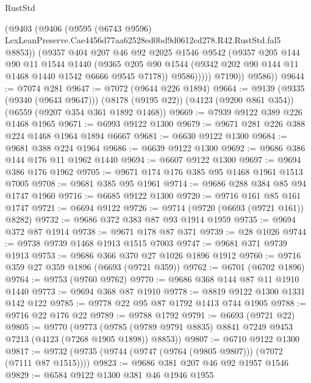\begin{lexlean}{RustStd}
\begin{coremodule}
                (@9403
                  (@9406
                    (@9595
                      (@6743 @9596)
                      LexLeanPreserve.Cae4456d77aa62528ed0bd9d0612cd278.R42.RustStd.fal5
                      @8853))
                  (@9357
                    @404
                    @207
                    @46
                    @92
                    @2025
                    @1546
                    @9542
                    (@9357
                      @205
                      @144
                      @90
                      @11
                      @1544
                      @1440
                      (@9365
                        @205
                        @90
                        @1544
                        (@9342 @202 @90 @144 @11 @1468 @1440 @1542 @6666 @9545 @7178))
                      @9586)))))
            @7190))
        @9586))
@9644 := @7074 @281
@9647 := @7072 (@9644 @226 @1894)
@9664 := @9139
    (@9335 (@9340 (@9643 @9647)))
    (@8178 (@9195 @22))
    (@4123 (@9200 @861 @354))
    (@6559 (@9207 @354 @361 @1892 @1468))
@9669 := @7939 @9122 @389 @226 @1468 @1965
@9671 := @6993 @9122 @1300
@9679 := @9671 @281 @226 @388 @224 @1468 @1964 @1894 @6667
@9681 := @6630 @9122 @1300
@9684 := @9681 @388 @224 @1964
@9686 := @6639 @9122 @1300
@9692 := @9686 @386 @144 @176 @11 @1962 @1440
@9694 := @6607 @9122 @1300
@9697 := @9694 @386 @176 @1962
@9705 := @9671 @174 @176 @385 @95 @1468 @1961 @1513 @7005
@9708 := @9681 @385 @95 @1961
@9714 := @9686 @288 @384 @85 @94 @1747 @1960
@9716 := @6685 @9122 @1300
@9720 := @9716 @161 @85 @161 @1747
@9721 := @6694 @9122
@9726 := @9714 (@9720 (@6693 (@9721 @161)) @8282)
@9732 := @9686 @372 @383 @87 @93 @1914 @1959
@9735 := @9694 @372 @87 @1914
@9738 := @9671 @178 @87 @371
@9739 := @28 @1026
@9744 := @9738 @9739 @1468 @1913 @1515 @7003
@9747 := @9681 @371 @9739 @1913
@9753 := @9686 @366 @370 @27 @1026 @1896 @1912
@9760 := @9716 @359 @27 @359 @1896 (@6693 (@9721 @359))
@9762 := @6701 (@6702 @1896)
@9764 := @9753 (@9760 @9762)
@9770 := @9686 @368 @144 @87 @11 @1910 @1440
@9773 := @9694 @368 @87 @1910
@9778 := @8819 @9122 @1300 @1331 @142 @122
@9785 := @9778 @22 @95 @87 @1792 @1413 @744 @1905
@9788 := @9716 @22 @176 @22
@9789 := @9788 @1792
@9791 := @6693 (@9721 @22)
@9805 := @9770
    (@9773 (@9785 (@9789 @9791 @8835) @8841 @7249 @9453 @7213 (@4123 (@7268 @1905 @1898)) @8853))
@9807 := @6710 @9122 @1300
@9817 := @9732 (@9735 (@9744 (@9747 (@9764 (@9805 @9807))) (@7072 (@7111 @87 @1515))))
@9823 := @9686 @381 @207 @46 @92 @1957 @1546
@9829 := @6584 @9122 @1300 @381 @46 @1946 @1955

\end{coremodule}
\end{lexlean}
